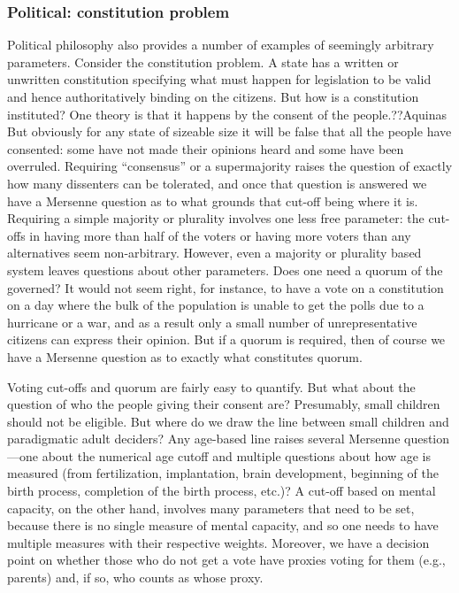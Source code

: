\subsubsection{Political: constitution problem}
Political philosophy also provides a number of examples of seemingly arbitrary parameters. Consider the constitution problem. A state has a written or unwritten
constitution specifying what must happen for legislation to be valid and hence authoritatively binding on the citizens. But 
how is a constitution instituted? One theory is that it happens by the consent of the people.??Aquinas But obviously for any state
of sizeable size it will be false that all the people have consented: some have not made their opinions heard and some have been
overruled. Requiring ``consensus'' or a supermajority raises the question of exactly how many dissenters can be tolerated, and
once that question is answered we have a Mersenne question as to what grounds that cut-off being where it is. Requiring a simple
majority or plurality involves one less free parameter: the cut-offs in having more than half of the voters or having more voters
than any alternatives seem non-arbitrary. However, even a majority or plurality based system leaves questions about other parameters.
Does one need a quorum of the governed? It would not seem right, for instance, to have a vote on a constitution on a day 
where the bulk of the population is unable to get the polls due to a hurricane or a war, and as a result only a small number of
unrepresentative citizens can express their opinion. But if a quorum is required, then of course we have a Mersenne question
as to exactly what constitutes quorum.

Voting cut-offs and quorum are fairly easy to quantify. But what about the question of who the people giving their consent are?
Presumably, small children should not be eligible. But where do we draw the line between small children and paradigmatic adult
deciders? Any age-based line raises several Mersenne question---one about the numerical age cutoff and multiple questions about 
how age is measured (from fertilization, implantation, brain development, beginning of the birth process, completion of the
birth process, etc.)? A cut-off based on mental capacity, on the other hand, involves many parameters that need to be set, because
there is no single measure of mental capacity, and so one needs to have multiple measures with their respective weights. Moreover,
we have a decision point on whether those who do not get a vote have proxies voting for them (e.g., parents) and, if so, who 
counts as whose proxy.

